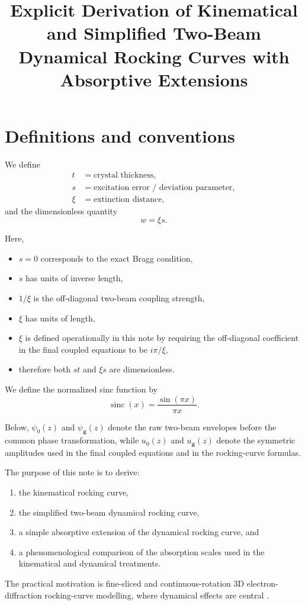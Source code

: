 \documentclass[11pt]{article}
\title{Explicit Derivation of Kinematical and Simplified Two-Beam Dynamical Rocking Curves with Absorptive Extensions}
\author{}
\date{}
\begin{document}
\maketitle

\section*{Definitions and conventions}

We define
\[
\begin{aligned}
t &= \text{crystal thickness},\\
s &= \text{excitation error / deviation parameter},\\
\xi &= \text{extinction distance},
\end{aligned}
\]
and the dimensionless quantity
\[
w = \xi s.
\]

Here,
\begin{itemize}
    \item \(s=0\) corresponds to the exact Bragg condition,
    \item \(s\) has units of inverse length,
    \item \(1/\xi\) is the off-diagonal two-beam coupling strength,
    \item \(\xi\) has units of length,
    \item \(\xi\) is defined operationally in this note by requiring the off-diagonal coefficient in the final coupled equations to be \(i\pi/\xi\),
    \item therefore both \(st\) and \(\xi s\) are dimensionless.
\end{itemize}

We define the normalized sinc function by
\begin{equation}\label{eq:sincdef}
\operatorname{sinc}(x)=\frac{\sin(\pi x)}{\pi x}.
\end{equation}

Below, \(\psi_0(z)\) and \(\psi_{\mathbf g}(z)\) denote the raw two-beam envelopes before the common phase transformation, while \(u_0(z)\) and \(u_{\mathbf g}(z)\) denote the symmetric amplitudes used in the final coupled equations and in the rocking-curve formulas.

The purpose of this note is to derive:
\begin{enumerate}
    \item the kinematical rocking curve,
    \item the simplified two-beam dynamical rocking curve,
    \item a simple absorptive extension of the dynamical rocking curve, and
    \item a phenomenological comparison of the absorption scales used in the kinematical and dynamical treatments.
\end{enumerate}
The practical motivation is fine-sliced and continuous-rotation 3D electron-diffraction rocking-curve modelling, where dynamical effects are central \cite{CleverleyBeanland2023_FineSliced3DED,KlarEtAl2023_Dynamical3DED}.
\end{document}
